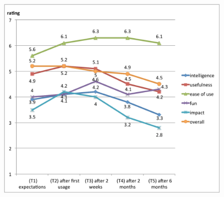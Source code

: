 \documentclass{frontiersSCNS} %
\begin{document}
\begin{figure}[b]
    \centering
    \includegraphics[width=0.5\columnwidth]{roomba-perception.pdf}

%
%
%
%



\end{figure}
\end{document}
